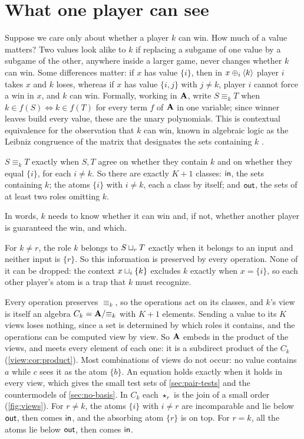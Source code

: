 \section{What one player can see}\label{sec:perspectives}

Suppose we care only about whether a player $k$ can win. How much of a value matters? Two values look alike to $k$ if replacing a subgame of one value by a subgame of the other, anywhere inside a larger game, never changes whether $k$ can win. Some differences matter: if $x$ has value $\{i\}$, then in $x\mathbin{\oplus_{i}}\langle k\rangle$ player $i$ takes $x$ and $k$ loses, whereas if $x$ has value $\{i,j\}$ with $j\ne k$, player $i$ cannot force a win in $x$, and $k$ can win. Formally, working in $\mathbf A$, write $S\equiv_k T$ when $k\in f(S)\Leftrightarrow k\in f(T)$ for every term $f$ of $\mathbf A$ in one variable; since winner leaves build every value, these are the unary polynomials. This is contextual equivalence for the observation that $k$ can win, known in algebraic logic as the Leibniz congruence of the matrix that designates the sets containing $k$ \cite{BlokPigozzi1989,Font1993}.

\begin{proposition}\label{view:thm:view}
$S\equiv_k T$ exactly when $S,T$ agree on whether they contain $k$ and on whether they equal $\{i\}$, for each $i\ne k$. So there are exactly $K+1$ classes:
$\mathsf{in}$, the sets containing $k$; the atoms $\{i\}$ with $i\ne k$, each a class by itself; and $\mathsf{out}$, the sets of at least two roles omitting $k$.
\end{proposition}

In words, $k$ needs to know whether it can win and, if not, whether another player is guaranteed the win, and which.

\begin{idea}
For $k\ne r$, the role $k$ belongs to $S\mathbin{\sqcup_{r}} T$ exactly when it belongs to an input and neither input is $\{r\}$. So this information is preserved by every operation. None of it can be dropped: the context $x\mathbin{\sqcup_{i}}\{k\}$ excludes $k$ exactly when $x=\{i\}$, so each other player's
atom is a trap that $k$ must recognize.
\end{idea}

Every operation preserves $\equiv_k$, so the operations act on its classes, and $k$'s view is itself an algebra $C_k=\mathbf A/{\equiv_k}$ with $K+1$ elements. Sending a value to its $K$ views loses nothing, since a set is determined by which roles it contains, and the operations can be computed view by view. So $\mathbf A$ embeds in the product of the views, and meets every element of each one: it is a subdirect product of the $C_k$ (\cref{view:cor:product}). Most combinations of views do not occur: no value contains $a$ while $c$ sees it as the atom $\{b\}$. An equation holds exactly when it holds in every view, which gives the small test sets of \cref{sec:pair-tests} and the countermodels of \cref{sec:no-basis}. In $C_k$ each $\star_r$ is the join of a small order (\cref{fig:views}). For $r\ne k$, the atoms $\{i\}$ with $i\ne r$ are incomparable and lie below $\mathsf{out}$, then comes $\mathsf{in}$, and the absorbing atom $\{r\}$ is on top. For $r=k$, all the atoms lie below $\mathsf{out}$, then comes $\mathsf{in}$.

